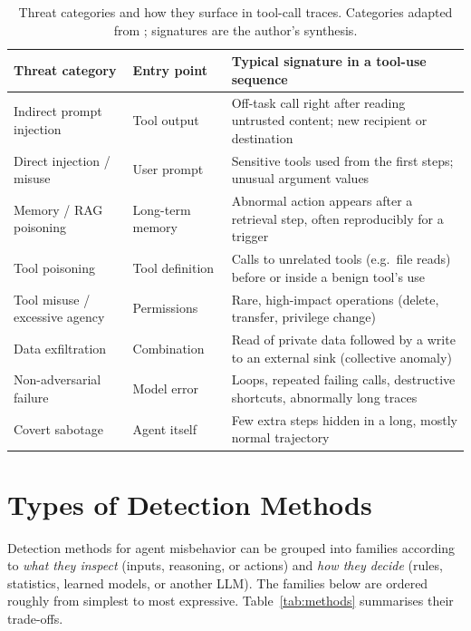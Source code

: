 \documentclass[11pt,a4paper]{article}
\begin{document}
\begin{table}[t]
\centering
\small
\begin{tabularx}{\linewidth}{L{3.3cm}L{2.6cm}Y}
\toprule
\textbf{Threat category} & \textbf{Entry point} & \textbf{Typical signature in a tool-use sequence} \\
\midrule
Indirect prompt injection & Tool output & Off-task call right after reading untrusted content; new recipient or destination \\
Direct injection / misuse & User prompt & Sensitive tools used from the first steps; unusual argument values \\
Memory / RAG poisoning & Long-term memory & Abnormal action appears after a retrieval step, often reproducibly for a trigger \\
Tool poisoning & Tool definition & Calls to unrelated tools (e.g.\ file reads) before or inside a benign tool's use \\
Tool misuse / excessive agency & Permissions & Rare, high-impact operations (delete, transfer, privilege change) \\
Data exfiltration & Combination & Read of private data followed by a write to an external sink (collective anomaly) \\
Non-adversarial failure & Model error & Loops, repeated failing calls, destructive shortcuts, abnormally long traces \\
Covert sabotage & Agent itself & Few extra steps hidden in a long, mostly normal trajectory \\
\bottomrule
\end{tabularx}
\caption{Threat categories and how they surface in tool-call traces. Categories adapted from \citep{owasp2025agentic,zhang2025asb}; signatures are the author's synthesis.}
\label{tab:threats}
\end{table}

\section{Types of Detection Methods}
\label{sec:methods}

Detection methods for agent misbehavior can be grouped into families according to \emph{what they inspect} (inputs, reasoning, or actions) and \emph{how they decide} (rules, statistics, learned models, or another LLM). The families below are ordered roughly from simplest to most expressive. Table~\ref{tab:methods} summarises their trade-offs.
\end{document}
